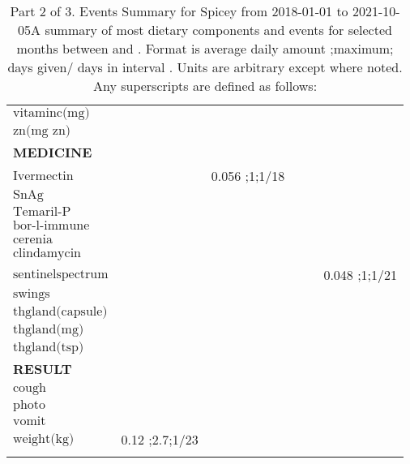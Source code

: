\begin{table}[H]
\begin{tabular}{|l|r|r|r|r|r|}
$\textrm{vitaminc(mg)}$&&&&&\\
$\textrm{zn(mg~zn)}$&&&&&\\
{\bf MEDICINE}&&&&&\\
$\textrm{Ivermectin}$&&0.056 ;1;1/18&&&\\
$\textrm{SnAg}$&&&&&\\
$\textrm{Temaril-P}$&&&&&\\
$\textrm{bor-l-immune}$&&&&&\\
$\textrm{cerenia}$&&&&&\\
$\textrm{clindamycin}$&&&&&\\
$\textrm{sentinelspectrum}$&&&&&0.048 ;1;1/21\\
$\textrm{swings}$&&&&&\\
$\textrm{thgland(capsule)}$&&&&&\\
$\textrm{thgland(mg)}$&&&&&\\
$\textrm{thgland(tsp)}$&&&&&\\
{\bf RESULT}&&&&&\\
$\textrm{cough}$&&&&&\\
$\textrm{photo}$&&&&&\\
$\textrm{vomit}$&&&&&\\
$\textrm{weight(kg)}$&0.12 ;2.7;1/23&&&&\\
&&&&&\\
\hline
\end{tabular}
\caption{Part 2 of 3.  Events Summary for Spicey   from 2018-01-01 to 2021-10-05A summary of most dietary components and events  for selected months between \mjmdatemin and \mjmdatemax. Format is average daily amount ;maximum; days given/ days in interval . Units are arbitrary except where noted. Any  superscripts are defined as follows:  \mjmsuperscripts}
\end{table}
